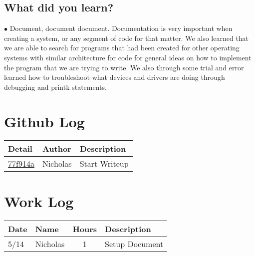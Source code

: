 \documentclass[letterpaper,10pt,fleqn,draftclsnofoot,onecolumn]{IEEEtran}
\begin{document}
	\subsection{What did you learn?}
	$\bullet$ Document, document document. Documentation is very important when creating a system, or any segment of code for that matter. We also learned that we are able to search for programs that had been created for other operating systems with similar architecture for code for general ideas on how to implement the program that we are trying to write. We also through some trial and error learned how to troubleshoot what devices and drivers are doing through debugging and printk statements.

	\section*{ Github Log }
	\begin{tabular}{l l p{1.5in}}\textbf{Detail} & \textbf{Author} & \textbf{Description}\\\hline
		\href{https://github.com/Skinnern/CS444/commit/77f914a6fe466b8115d31d7a97e08b2e86b00b7a}{77f914a} & Nicholas & Start Writeup\\\hline
	\end{tabular}
	
	
	\section*{Work Log}
	\begin{tabular}{l l c p{1.1in}}\textbf{Date} & \textbf{Name} & \textbf{Hours} & \textbf{Description}\\\hline
		5/14 & Nicholas & 1 & Setup Document\\\hline
	\end{tabular}
		\nocite{*}
		
	
\end{document}
